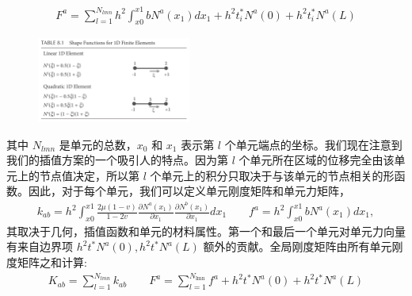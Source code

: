 \documentclass[12pt,a4paper]{book}
\begin{document}
\begin{equation*}
    \begin{aligned}
        F^{a}=\sum_{l=1}^{N_{l m n}} h^{2} \int_{x 0}^{x 1} b N^{a}\left(x_{1}\right) d x_{1}+h^{2} t_{i}^{*} N^{a}(0)+h^{2} t_{i}^{*} N^{a}(L)
    \end{aligned}
\end{equation*}

\begin{figure}[!ht]
	\centering
	\includegraphics[width=0.45\textwidth]{Table_8_1.png}
\end{figure}
其中 $N_{lmn}$ 是单元的总数，$x_0$ 和 $x_1$ 表示第 $l$ 个单元端点的坐标。我们现在注意到我们的插值方案的一个吸引人的特点。因为第 $l$ 个单元所在区域的位移完全由该单元上的节点值决定，所以第 $l$ 个单元上的积分只取决于与该单元的节点相关的形函数。因此，对于每个单元，我们可以定义单元刚度矩阵和单元力矩阵，
\begin{equation*}
    \begin{aligned}
        k_{a b}=h^{2} \int_{x 0}^{x 1} \frac{2 \mu(1-v)}{1-2 v} \frac{\partial N^{a}\left(x_{1}\right)}{\partial x_{1}} \frac{\partial N^{b}\left(x_{1}\right)}{\partial x_{1}} d x_{1}
        \qquad
        f^{a}=h^{2} \int_{x 0}^{x 1} b N^{a}\left(x_{1}\right) d x_{1},
    \end{aligned}
\end{equation*}
其取决于几何，插值函数和单元的材料属性。第一个和最后一个单元对单元力向量有来自边界项 $h^2 t^* N^a(0), h^2 t^* N^a(L)$ 额外的贡献。全局刚度矩阵由所有单元刚度矩阵之和计算:
\begin{equation*}
    \begin{aligned}
        K_{a b}=\sum_{l=1}^{N_{l m n}} k_{a b} 
        \qquad
        F^{a}=\sum_{l=1}^{N_{\operatorname{lmn}}} f^{a}+h^{2} t^{*} N^{a}(0)+h^{2} t^{*} N^{a}(L)
    \end{aligned}
\end{equation*}



% 







\end{document}

